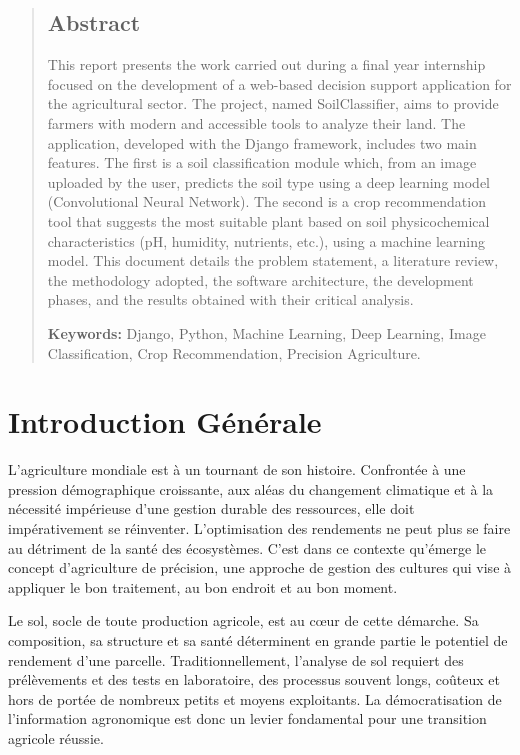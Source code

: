 \documentclass[12pt, a4paper]{report}
\begin{document}
\begin{abstract}
\section*{Abstract}
This report presents the work carried out during a final year internship focused on the development of a web-based decision support application for the agricultural sector. The project, named SoilClassifier, aims to provide farmers with modern and accessible tools to analyze their land. The application, developed with the Django framework, includes two main features. The first is a soil classification module which, from an image uploaded by the user, predicts the soil type using a deep learning model (Convolutional Neural Network). The second is a crop recommendation tool that suggests the most suitable plant based on soil physicochemical characteristics (pH, humidity, nutrients, etc.), using a machine learning model. This document details the problem statement, a literature review, the methodology adopted, the software architecture, the development phases, and the results obtained with their critical analysis.

\vspace{0.5cm}
\textbf{Keywords:} Django, Python, Machine Learning, Deep Learning, Image Classification, Crop Recommendation, Precision Agriculture.
\end{abstract}

\clearpage
\tableofcontents
\clearpage

\chapter{Introduction Générale}
L'agriculture mondiale est à un tournant de son histoire. Confrontée à une pression démographique croissante, aux aléas du changement climatique et à la nécessité impérieuse d'une gestion durable des ressources, elle doit impérativement se réinventer. L'optimisation des rendements ne peut plus se faire au détriment de la santé des écosystèmes. C'est dans ce contexte qu'émerge le concept d'agriculture de précision, une approche de gestion des cultures qui vise à appliquer le bon traitement, au bon endroit et au bon moment.

Le sol, socle de toute production agricole, est au cœur de cette démarche. Sa composition, sa structure et sa santé déterminent en grande partie le potentiel de rendement d'une parcelle. Traditionnellement, l'analyse de sol requiert des prélèvements et des tests en laboratoire, des processus souvent longs, coûteux et hors de portée de nombreux petits et moyens exploitants. La démocratisation de l'information agronomique est donc un levier fondamental pour une transition agricole réussie.
\end{document}
